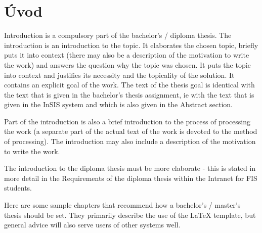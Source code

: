 \chapter*{Úvod}

Introduction is a compulsory part of the bachelor's / diploma thesis. The introduction is an introduction to the topic. It elaborates the chosen topic, briefly puts it into context (there may also be a description of the motivation to write the work) and answers the question why the topic was chosen. It puts the topic into context and justifies its necessity and the topicality of the solution. It contains an explicit goal of the work. The text of the thesis goal is identical with the text that is given in the bachelor's thesis assignment, ie with the text that is given in the InSIS system and which is also given in the Abstract section.

Part of the introduction is also a brief introduction to the process of processing the work (a separate part of the actual text of the work is devoted to the method of processing). The introduction may also include a description of the motivation to write the work.

The introduction to the diploma thesis must be more elaborate - this is stated in more detail in the Requirements of the diploma thesis within the Intranet for FIS students.

Here are some sample chapters that recommend how a bachelor's / master's thesis should be set. They primarily describe the use of the \LaTeX{} template, but general advice will also serve users of other systems well.